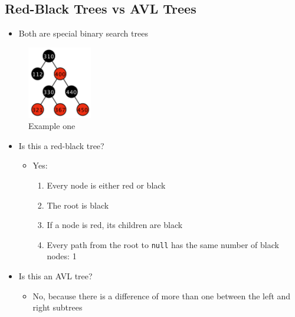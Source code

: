 \documentclass[
  10pt,
  english,
  letterpaper,
,tablecaptionabove
]{scrartcl}
\newcommand{\passthrough}[1]{#1}
\providecommand{\tightlist}{%
  \setlength{\itemsep}{0pt}\setlength{\parskip}{0pt}}
\begin{document}
\hypertarget{red-black-trees-vs-avl-trees}{%
\subsection{Red-Black Trees vs AVL
Trees}\label{red-black-trees-vs-avl-trees}}

\begin{itemize}
\tightlist
\item
  Both are special binary search trees
\end{itemize}

\begin{figure}
\centering
\includegraphics[width=0.25\textwidth,height=\textheight]{images/1.png}
\caption{Example one}
\end{figure}

\begin{itemize}
\tightlist
\item
  Is this a red-black tree?

  \begin{itemize}
  \tightlist
  \item
    Yes:

    \begin{enumerate}
    \def\labelenumi{\arabic{enumi}.}
    \tightlist
    \item
      Every node is either red or black
    \item
      The root is black
    \item
      If a node is red, its children are black
    \item
      Every path from the root to \passthrough{\lstinline!null!} has the
      same number of black nodes: 1
    \end{enumerate}
  \end{itemize}
\item
  Is this an AVL tree?

  \begin{itemize}
  \tightlist
  \item
    No, because there is a difference of more than one between the left
    and right subtrees
  \end{itemize}
\end{itemize}
\end{document}
